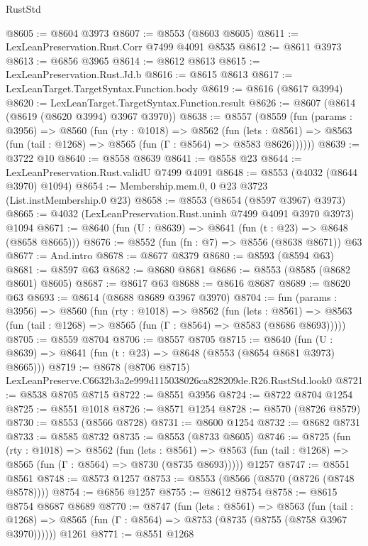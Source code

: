 \begin{lexlean}{RustStd}
\begin{coremodule}
@8605 := @8604 @3973
@8607 := @8553 (@8603 @8605)
@8611 := LexLeanPreservation.Rust.Corr @7499 @4091 @8535
@8612 := @8611 @3973
@8613 := @6856 @3965
@8614 := @8612 @8613
@8615 := LexLeanPreservation.Rust.Jd.b
@8616 := @8615 @8613
@8617 := LexLeanTarget.TargetSyntax.Function.body
@8619 := @8616 (@8617 @3994)
@8620 := LexLeanTarget.TargetSyntax.Function.result
@8626 := @8607 (@8614 (@8619 (@8620 @3994) @3967 @3970))
@8638 := @8557
    (@8559
      (fun (params : @3956) =>
      @8560
        (fun (rty : @1018) =>
        @8562
          (fun (lets : @8561) =>
          @8563 (fun (tail : @1268) => @8565 (fun (Γ : @8564) => @8583 @8626))))))
@8639 := @3722 @10
@8640 := @8558 @8639
@8641 := @8558 @23
@8644 := LexLeanPreservation.Rust.validU @7499 @4091
@8648 := @8553 (@4032 (@8644 @3970) @1094)
@8654 := Membership.mem.{0, 0} @23 @3723 (List.instMembership.{0} @23)
@8658 := @8553 (@8654 (@8597 @3967) @3973)
@8665 := @4032 (LexLeanPreservation.Rust.uninh @7499 @4091 @3970 @3973) @1094
@8671 := @8640 (fun (U : @8639) => @8641 (fun (t : @23) => @8648 (@8658 @8665)))
@8676 := @8552 (fun (fn : @7) => @8556 (@8638 @8671)) @63
@8677 := And.intro
@8678 := @8677 @8379
@8680 := @8593 (@8594 @63)
@8681 := @8597 @63
@8682 := @8680 @8681
@8686 := @8553 (@8585 (@8682 @8601) @8605)
@8687 := @8617 @63
@8688 := @8616 @8687
@8689 := @8620 @63
@8693 := @8614 (@8688 @8689 @3967 @3970)
@8704 := fun (params : @3956) =>
  @8560
    (fun (rty : @1018) =>
    @8562
      (fun (lets : @8561) =>
      @8563 (fun (tail : @1268) => @8565 (fun (Γ : @8564) => @8583 (@8686 @8693)))))
@8705 := @8559 @8704
@8706 := @8557 @8705
@8715 := @8640 (fun (U : @8639) => @8641 (fun (t : @23) => @8648 (@8553 (@8654 @8681 @3973) @8665)))
@8719 := @8678 (@8706 @8715) LexLeanPreserve.C6632b3a2e999d115038026ca828209de.R26.RustStd.look0
@8721 := @8538 @8705 @8715
@8722 := @8551 @3956
@8724 := @8722 @8704 @1254
@8725 := @8551 @1018
@8726 := @8571 @1254
@8728 := @8570 (@8726 @8579)
@8730 := @8553 (@8566 @8728)
@8731 := @8600 @1254
@8732 := @8682 @8731
@8733 := @8585 @8732
@8735 := @8553 (@8733 @8605)
@8746 := @8725
    (fun (rty : @1018) =>
    @8562
      (fun (lets : @8561) =>
      @8563 (fun (tail : @1268) => @8565 (fun (Γ : @8564) => @8730 (@8735 @8693)))))
    @1257
@8747 := @8551 @8561
@8748 := @8573 @1257
@8753 := @8553 (@8566 (@8570 (@8726 (@8748 @8578))))
@8754 := @6856 @1257
@8755 := @8612 @8754
@8758 := @8615 @8754 @8687 @8689
@8770 := @8747
    (fun (lets : @8561) =>
    @8563
      (fun (tail : @1268) => @8565 (fun (Γ : @8564) => @8753 (@8735 (@8755 (@8758 @3967 @3970))))))
    @1261
@8771 := @8551 @1268

\end{coremodule}
\end{lexlean}

